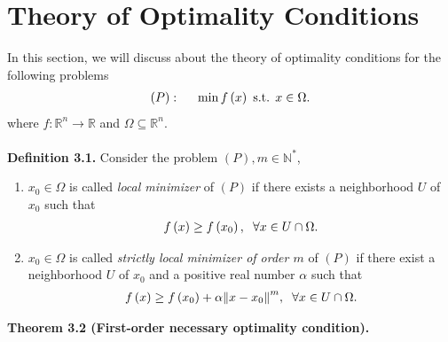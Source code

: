 \documentclass[a4paper]{article}
\numberwithin{equation}{section}
\begin{document}
\section{Theory of Optimality Conditions}
In this section, we will discuss about the theory of optimality conditions for the following problems
\begin{align}
\left( P \right): \hspace{0.5cm}\min f\left( x \right)\mbox{ s.t. } x \in \Omega .
\end{align}
where $f:\mathbb{R}^n\to \mathbb{R}$ and $\Omega  \subseteq {\mathbb{R}^n}$.\\
\\
\textbf{Definition 3.1.} Consider the problem $\left(P\right), m\in \mathbb{N}^*$,
\begin{enumerate}
\item $x_0 \in \Omega$ is called \textit{local minimizer} of $\left(P\right)$ if there exists a neighborhood $U$ of $x_0$ such that
\begin{align}
f\left( x \right) \ge f\left( {{x_0}} \right),\hspace{0.2cm}\forall x \in U \cap \Omega .
\end{align}
\item $x_0\in \Omega$ is called \textit{strictly local minimizer of order $m$} of $\left(P\right)$ if there exist a neighborhood $U$ of $x_0$ and a positive real number $\alpha$ such that
\begin{align}
f\left( x \right) \ge f\left( {{x_0}} \right) + \alpha {\left\| {x - {x_0}} \right\|^m}, \hspace{0.2cm}\forall x \in U \cap \Omega .
\end{align}
\end{enumerate}
\textbf{Theorem 3.2 (First-order necessary optimality condition).} 
\end{document}
